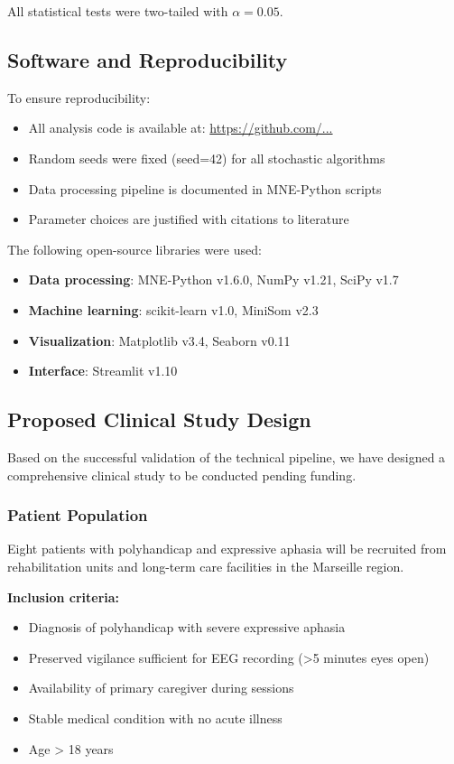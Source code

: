 All statistical tests were two-tailed with $\alpha = 0.05$.

\subsection{Software and Reproducibility}

To ensure reproducibility:

\begin{itemize}
    \item All analysis code is available at: \url{https://github.com/...}
    \item Random seeds were fixed (seed=42) for all stochastic algorithms
    \item Data processing pipeline is documented in MNE-Python scripts
    \item Parameter choices are justified with citations to literature
\end{itemize}

The following open-source libraries were used:
\begin{itemize}
    \item \textbf{Data processing}: MNE-Python v1.6.0, NumPy v1.21, SciPy v1.7
    \item \textbf{Machine learning}: scikit-learn v1.0, MiniSom v2.3
    \item \textbf{Visualization}: Matplotlib v3.4, Seaborn v0.11
    \item \textbf{Interface}: Streamlit v1.10
\end{itemize}

\subsection{Proposed Clinical Study Design}

Based on the successful validation of the technical pipeline, we have designed a comprehensive clinical study to be conducted pending funding.

\subsubsection{Patient Population}

Eight patients with polyhandicap and expressive aphasia will be recruited from rehabilitation units and long-term care facilities in the Marseille region.

\textbf{Inclusion criteria:}
\begin{itemize}
    \item Diagnosis of polyhandicap with severe expressive aphasia
    \item Preserved vigilance sufficient for EEG recording (>5 minutes eyes open)
    \item Availability of primary caregiver during sessions
    \item Stable medical condition with no acute illness
    \item Age > 18 years
\end{itemize}

